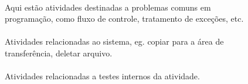 \documentclass[letterpaper,10pt,brazil]{sphinxmanual}
\begin{document}
\paragraph{}
\label{\detokenize{interface_guide:programming-programacao}}
\begin{figure}[htbp]
\centering
\capstart

\noindent{}
\caption{Aqui estão atividades destinadas a problemas comuns em programação, como fluxo de controle, tratamento de exceções, etc.}\label{\detokenize{interface_guide:id6}}\end{figure}


\paragraph{}
\label{\detokenize{interface_guide:system-sistema}}
\begin{figure}[htbp]
\centering
\capstart

\noindent{}
\caption{Atividades relacionadas ao sistema, eg. copiar para a área de transferência, deletar arquivo.}\label{\detokenize{interface_guide:id7}}\end{figure}


\paragraph{}
\label{\detokenize{interface_guide:testing-testes}}
\begin{figure}[htbp]
\centering
\capstart

\noindent{}
\caption{Atividades relacionadas a testes internos da atividade.}\label{\detokenize{interface_guide:id8}}\end{figure}
\end{document}
